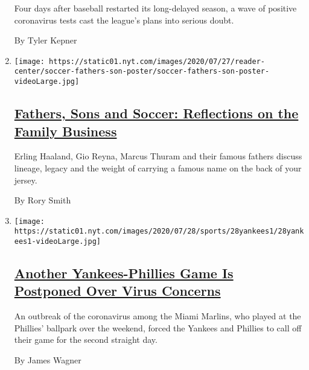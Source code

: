 \begin{enumerate}
  Four days after baseball restarted its long-delayed season, a wave of
  positive coronavirus tests cast the league's plans into serious doubt.

  By Tyler Kepner
\item
  \texttt{[image: https://static01.nyt.com/images/2020/07/27/reader-center/soccer-fathers-son-poster/soccer-fathers-son-poster-videoLarge.jpg]}

  \hypertarget{fathers-sons-and-soccer-reflections-on-the-family-business}{%
  \subsection{\texorpdfstring{\href{/2020/07/28/sports/soccer/erling-haaland-gio-reyna-thuram.html}{Fathers,
  Sons and Soccer: Reflections on the Family
  Business}}{Fathers, Sons and Soccer: Reflections on the Family Business}}\label{fathers-sons-and-soccer-reflections-on-the-family-business}}

  Erling Haaland, Gio Reyna, Marcus Thuram and their famous fathers
  discuss lineage, legacy and the weight of carrying a famous name on
  the back of your jersey.

  By Rory Smith
\item
  \texttt{[image: https://static01.nyt.com/images/2020/07/28/sports/28yankees1/28yankees1-videoLarge.jpg]}

  \hypertarget{another-yankees-phillies-game-is-postponed-over-virus-concerns}{%
  \subsection{\texorpdfstring{\href{/2020/07/28/sports/baseball/yankees-phillies-postponed.html}{Another
  Yankees-Phillies Game Is Postponed Over Virus
  Concerns}}{Another Yankees-Phillies Game Is Postponed Over Virus Concerns}}\label{another-yankees-phillies-game-is-postponed-over-virus-concerns}}

  An outbreak of the coronavirus among the Miami Marlins, who played at
  the Phillies' ballpark over the weekend, forced the Yankees and
  Phillies to call off their game for the second straight day.

  By James Wagner
\end{enumerate}

